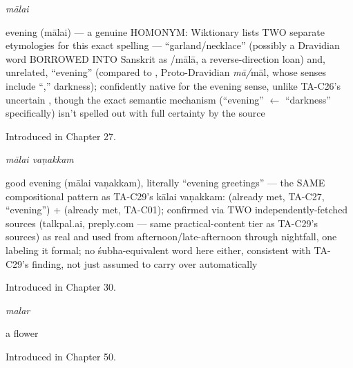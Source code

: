 \noindent\begin{minipage}[t]{\linewidth}
\raggedright
\textbf{}\enspace\emph{mālai}\par
\small evening (mālai) — a genuine HOMONYM: Wiktionary lists TWO separate etymologies for this exact spelling — \textquotedblleft{}garland/necklace\textquotedblright{} (possibly a Dravidian word BORROWED INTO Sanskrit as /mālā, a reverse-direction loan) and, unrelated, \textquotedblleft{}evening\textquotedblright{} (compared to , Proto-Dravidian \emph{mā/}māl, whose senses include \textquotedblleft{},\textquotedblright{} darkness); confidently native for the evening sense, unlike TA-C26's uncertain , though the exact semantic mechanism (\textquotedblleft{}evening\textquotedblright{} $\leftarrow$ \textquotedblleft{}darkness\textquotedblright{} specifically) isn't spelled out with full certainty by the source\par
\footnotesize Introduced in Chapter 27.
\end{minipage}\par\medskip

\noindent\begin{minipage}[t]{\linewidth}
\raggedright
\textbf{ }\enspace\emph{mālai vaṇakkam}\par
\small good evening (mālai vaṇakkam), literally \textquotedblleft{}evening greetings\textquotedblright{} — the SAME compositional pattern as TA-C29's kālai vaṇakkam:  (already met, TA-C27, \textquotedblleft{}evening\textquotedblright{}) +  (already met, TA-C01); confirmed via TWO independently-fetched sources (talkpal.ai, preply.com — same practical-content tier as TA-C29's sources) as real and used from afternoon/late-afternoon through nightfall, one labeling it formal; no śubha-equivalent word here either, consistent with TA-C29's finding, not just assumed to carry over automatically\par
\footnotesize Introduced in Chapter 30.
\end{minipage}\par\medskip

\noindent\begin{minipage}[t]{\linewidth}
\raggedright
\textbf{}\enspace\emph{malar}\par
\small a flower\par
\footnotesize Introduced in Chapter 50.
\end{minipage}\par\medskip

